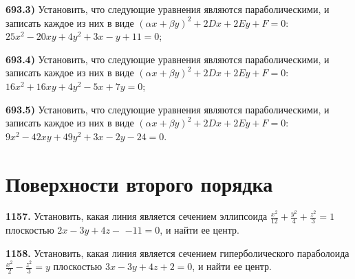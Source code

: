 \textbf{693.3)} Установить, что следующие уравнения являются параболическими, и записать каждое из них в виде $(\alpha x+\beta y)^2+2 D x+2 E y+F=0$: $25 x^2-20 x y+4 y^2+3 x-y+11=0$;

\textbf{693.4)} Установить, что следующие уравнения являются параболическими, и записать каждое из них в виде $(\alpha x+\beta y)^2+2 D x+2 E y+F=0$: $16 x^2+16 x y+4 y^2-5 x+7 y=0$;

\textbf{693.5)} Установить, что следующие уравнения являются параболическими, и записать каждое из них в виде $(\alpha x+\beta y)^2+2 D x+2 E y+F=0$: $9 x^2-42 x y+49 y^2+3 x-2 y-24=0$.



\section{Поверхности второго порядка}



\textbf{1157.} Установить, какая линия является сечением эллипсоида $\frac{x^2}{12}+\frac{y^2}{4}+\frac{z^2}{3}=1$ плоскостью $2 x-3 y+4 z-$ $-11=0$, и найти ее центр.

\textbf{1158.} Установить, какая линия является сечением гиперболического параболоида $\frac{x^2}{2}-\frac{z^2}{3}=y$ плоскостью $3 x-3 y+4 z+2=0$, и найти ее центр.